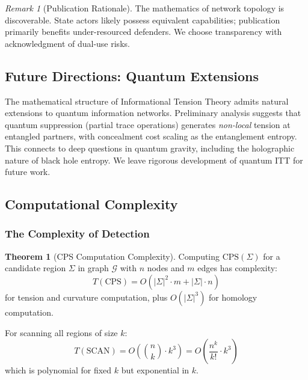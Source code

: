 \documentclass[12pt,a4paper]{article}
\theoremstyle{definition}
\newtheorem{theorem}{Theorem}[section]
\theoremstyle{remark}
\newtheorem{remark}{Remark}[section]
\newcommand{\Graph}{\mathcal{G}}         %
\begin{document}
\begin{remark}[Publication Rationale]
The mathematics of network topology is discoverable. State actors likely possess equivalent capabilities; publication primarily benefits under-resourced defenders. We choose transparency with acknowledgment of dual-use risks.
\end{remark}

\subsection{Future Directions: Quantum Extensions}

The mathematical structure of Informational Tension Theory admits natural extensions to quantum information networks. Preliminary analysis suggests that quantum suppression (partial trace operations) generates \emph{non-local} tension at entangled partners, with concealment cost scaling as the entanglement entropy. This connects to deep questions in quantum gravity, including the holographic nature of black hole entropy. We leave rigorous development of quantum ITT for future work.

\subsection{Computational Complexity}

\subsubsection{The Complexity of Detection}

\begin{theorem}[CPS Computation Complexity]
\label{thm:complexity}
Computing $\text{CPS}(\Sigma)$ for a candidate region $\Sigma$ in graph $\Graph$ with $n$ nodes and $m$ edges has complexity:
\begin{equation}
    T(\text{CPS}) = O(|\Sigma|^2 \cdot m + |\Sigma| \cdot n)
\end{equation}
for tension and curvature computation, plus $O(|\Sigma|^3)$ for homology computation.

For scanning all regions of size $k$:
\begin{equation}
    T(\text{SCAN}) = O\left( \binom{n}{k} \cdot k^3 \right) = O\left( \frac{n^k}{k!} \cdot k^3 \right)
\end{equation}
which is polynomial for fixed $k$ but exponential in $k$.
\end{theorem}
\end{document}
